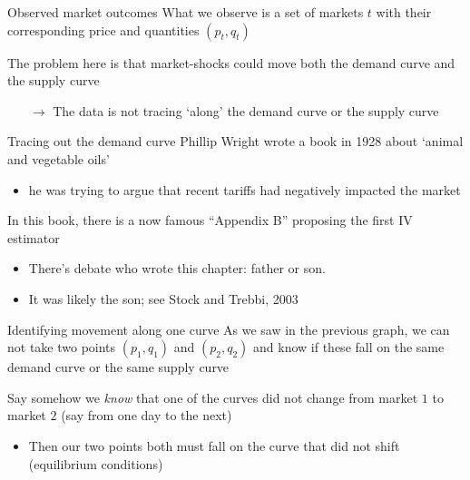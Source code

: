 \documentclass[aspectratio=169,t,11pt,table]{beamer}
\begin{document}
\begin{frame}{Observed market outcomes}
  What we observe is a set of markets $t$ with their corresponding price and quantities $(p_t, q_t)$

  \bigskip
  The problem here is that market-shocks could move both the demand curve and the supply curve
  \begin{itemize}
    \item[$\rightarrow$] The data is not tracing `along' the demand curve or the supply curve
  \end{itemize}
\end{frame}


\begin{frame}{Tracing out the demand curve}
  Phillip Wright wrote a book in 1928 about `animal and vegetable oils'
  \begin{itemize}
    \item he was trying to argue that recent tariffs had negatively impacted the market
  \end{itemize}

  \bigskip
  In this book, there is a now famous ``Appendix B'' proposing the first IV estimator
  \begin{itemize}
    \item There's debate who wrote this chapter: father or son. 
    
    \item It was likely the son; see Stock and Trebbi, 2003
  \end{itemize} 
\end{frame}

\begin{frame}{Identifying movement along one curve}
  As we saw in the previous graph, we can not take two points $(p_1, q_1)$ and $(p_2, q_2)$ and know if these fall on the same demand curve or the same supply curve

  \bigskip
  Say somehow we \emph{know} that one of the curves did not change from market $1$ to market $2$ (say from one day to the next)
  \begin{itemize}
    \item Then our two points both must fall on the curve that did not shift (equilibrium conditions)
  \end{itemize}
\end{frame}

\end{document}
